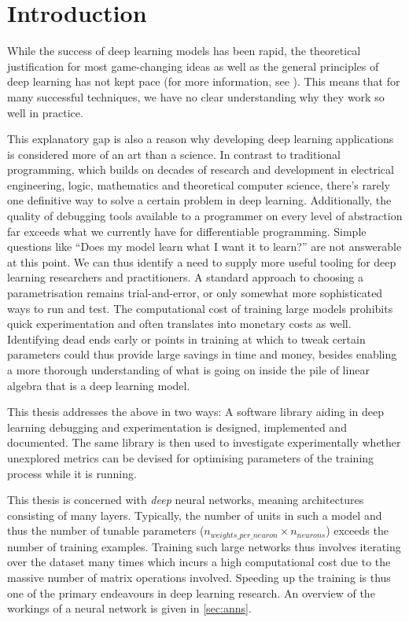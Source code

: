 \chapter{Introduction}\label{sec:introduction}

While the success of deep learning models has been rapid, the theoretical
justification for most game-changing ideas as well as the general principles of
deep learning has not kept pace (for more information, see \cite{arora2018}).
This means that for many successful techniques, we have no clear understanding
why they work so well in practice.

This explanatory gap is also a reason why developing deep learning applications
is considered more of an art than a science. In contrast to traditional
programming, which builds on decades of research and development in electrical
engineering, logic, mathematics and theoretical computer science, there's rarely
one definitive way to solve a certain problem in deep learning.  Additionally,
the quality of debugging tools available to a programmer on every level of
abstraction far exceeds what we currently have for differentiable programming.
Simple questions like ``Does my model learn what I want it to learn?'' are not
answerable at this point.  We can thus identify a need to supply more useful
tooling for deep learning researchers and practitioners.  A standard approach to
choosing a parametrisation remains trial-and-error, or only somewhat more
sophisticated ways to run and test.  The computational cost of training large
models prohibits quick experimentation and often translates into monetary costs
as well.  Identifying dead ends early or points in training at which to tweak
certain parameters could thus provide large savings in time and money, besides
enabling a more thorough understanding of what is going on inside the pile of
linear algebra that is a deep learning model.

This thesis addresses the above in two ways: A software library aiding in deep
learning debugging and experimentation is designed, implemented and documented. The same
library is then used to investigate experimentally whether unexplored
metrics can be devised for optimising parameters of the training process while it is running.

This thesis is concerned with \emph{deep} neural networks, meaning
architectures consisting of many layers. Typically, the number of units
in such a model and thus the number of tunable parameters
(\(n_{weights\_per\_neuron} \times n_{neurons}\)) exceeds the number of
training examples. Training such large networks thus involves iterating
over the dataset many times which incurs a high computational cost due
to the massive number of matrix operations involved. Speeding up the
training is thus one of the primary endeavours in deep learning
research. An overview of the workings of a neural network is given in
\cref{sec:anns}.

